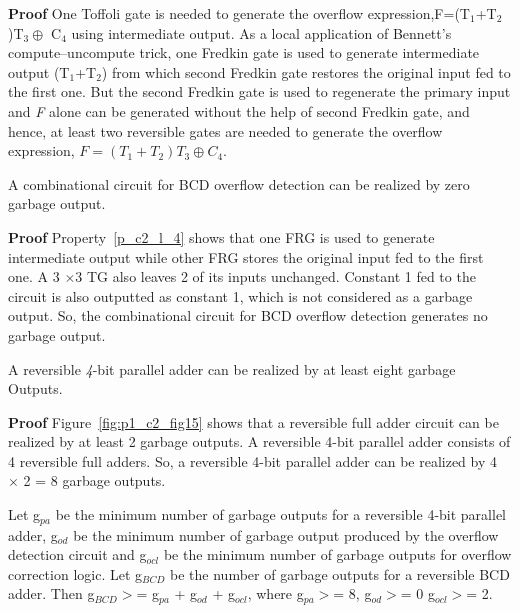 \noindent\textbf{Proof}	One Toffoli gate is needed to generate the overflow expression,F=(T${}_{1}$+T${}_{2}$)T${}_{3}\oplus$ C${}_{4}$ using intermediate output. As a local application of Bennett's compute--uncompute trick, one Fredkin gate is used to generate intermediate output (T${}_{1}$+T${}_{2}$) from which second Fredkin gate restores the original input fed to the first one. But the second Fredkin gate is used to regenerate the primary input and \textit{F} alone can be generated without the help of second Fredkin gate, and hence, at least two reversible gates are needed to generate the overflow expression, $F = (T{}_{1}+T{}_{2})T{}_{3}\oplus C{}_{4}$.


\begin{property}\label{p_c2_l_4}\textnormal{
		A combinational circuit for BCD overflow detection can be realized by zero garbage output.}
\end{property}


\noindent\textbf{Proof}
Property~\ref{p_c2_l_4} shows that one FRG is used to generate intermediate output while other FRG stores the original input fed to the first one. A 3 ${\times}$3 TG also leaves 2 of its inputs unchanged.  Constant 1 fed to the circuit is also outputted as constant 1, which is not considered as a garbage output. So, the combinational circuit for BCD overflow detection generates no garbage output.


\begin{property}\label{p_c2_l_5}\textnormal{
		A reversible {\it 4}-bit parallel adder can be realized by at least eight garbage Outputs.}
\end{property}

\noindent\textbf{Proof}
Figure~\ref{fig:p1_c2_fig15} shows that a reversible full adder circuit can be realized by at least 2 garbage outputs. A reversible {4}-bit parallel adder consists of 4 reversible full adders. So, a reversible {4}-bit parallel adder can be realized by 4 ${\times}$ 2 = 8 garbage outputs.


\begin{property}\label{p_c2_l_6}\textnormal{
		Let g${}_{pa}$ be the minimum number of garbage outputs for a reversible 4-bit parallel adder, g${}_{od}$ be the minimum number of garbage output produced by the overflow detection circuit and g${}_{ocl}$ be the minimum number of garbage outputs for overflow correction logic. Let g${}_{BCD}$ be the number of garbage outputs for a reversible BCD adder. Then
		g${}_{BCD}$${>}$= g${}_{pa}$ + g${}_{od}$ + g${}_{ocl}$, where g${}_{pa}$${>}$= 8, g${}_{od}$${>}$= 0 g${}_{ocl}$${>}$=  2.}
\end{property}


